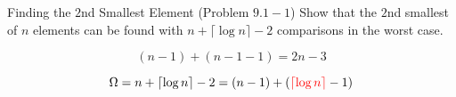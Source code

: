 
\begin{frame}{}
  \begin{exampleblock}{Finding the $2$nd Smallest Element (Problem $9.1-1$)}
    Show that the $2$nd smallest of $n$ elements can be found with $n + \lceil \log n \rceil - 2$
    comparisons in the worst case.
  \end{exampleblock}

  \pause
  \[
    (n-1) + (n-1-1) = 2n-3
  \]
\end{frame}

\begin{frame}{}
  \begin{adjustbox}{max totalsize={.7\textwidth}{.6\textheight},center}
    
  \end{adjustbox}



\end{frame}

\begin{frame}{}
  \centerline{}

  \pause
  \[
    \Omega = n + \lceil \log n \rceil - 2 = (n-1) + (\textcolor{red}{\lceil \log n \rceil} - 1)
  \]

  \pause
  \centerline{}
\end{frame}

